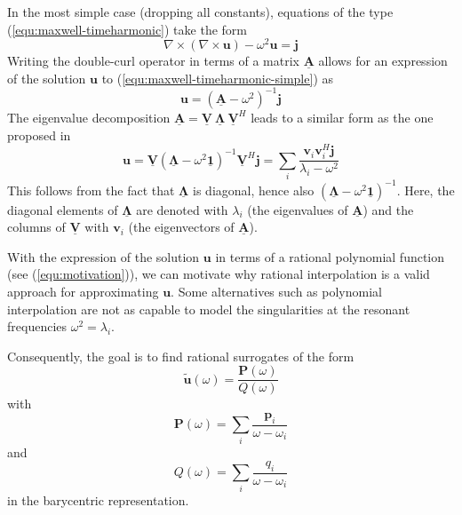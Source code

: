\documentclass[11pt, a4paper]{article}
\begin{document}
In the most simple case (dropping all constants), equations of the type
(\ref{equ:maxwell-timeharmonic}) take the form
\begin{equation}
    \nabla \times (\nabla \times \mathbf{u}) - \omega^2 \mathbf{u} = \mathbf{j}
    \label{equ:maxwell-timeharmonic-simple}
\end{equation}
Writing the double-curl operator in terms of a matrix $\mathbf{\underline{A}}$
allows for an expression of the solution $\mathbf{u}$ to (\ref{equ:maxwell-timeharmonic-simple})
as
\begin{equation}
    \mathbf{u} = (\mathbf{\underline{A}} - \omega^2)^{-1} \mathbf{j}
\end{equation}
The eigenvalue decomposition $\mathbf{\underline{A}} = \mathbf{\underline{V}}
~ \boldsymbol{\underline{\Lambda}} ~ \mathbf{\underline{V}}^H$
leads to a similar form as the one proposed in \cite{helmholtz-motivation}
\begin{equation}
    \mathbf{u} = \mathbf{\underline{V}} (\boldsymbol{\underline{\Lambda}} - \omega^2 \boldsymbol{\underline{1}})^{-1} \mathbf{\underline{V}}^H \mathbf{j} 
    = \sum_i \frac{\mathbf{v}_i \mathbf{v}_i^H \mathbf{j}}{\lambda_i - \omega^2} \label{equ:motivation}
\end{equation}
This follows from the fact that $\boldsymbol{\underline{\Lambda}}$ is diagonal,
hence also $(\boldsymbol{\underline{\Lambda}} - \omega^2 \boldsymbol{\underline{1}})^{-1}$.
Here, the diagonal elements of $\boldsymbol{\underline{\Lambda}}$ are denoted with 
$\lambda_i$ (the eigenvalues of $\mathbf{\underline{A}}$) and the columns of
$\mathbf{\underline{V}}$ with $\mathbf{v}_i$ (the eigenvectors of $\mathbf{\underline{A}}$).

With the expression of the solution $\mathbf{u}$ in terms of a rational polynomial
function (see (\ref{equ:motivation})), we can motivate why rational interpolation
is a valid approach for approximating $\mathbf{u}$. Some alternatives such as polynomial
interpolation are not as capable to model the singularities at the resonant
frequencies $\omega^2 = \lambda_i$.

Consequently, the goal is to find rational surrogates of the form
\begin{equation}
    \mathbf{\tilde{u}}(\omega) = \frac{\mathbf{P}(\omega)}{Q(\omega)}
\end{equation}
with
\begin{equation}
    \mathbf{P}(\omega) = \sum_i \frac{\mathbf{p}_i}{\omega - \omega_i}
\end{equation}
and
\begin{equation}
    Q(\omega) = \sum_i \frac{q_i}{\omega - \omega_i} \label{equ:surrogate-denominator}
\end{equation}
in the barycentric representation.
\end{document}

